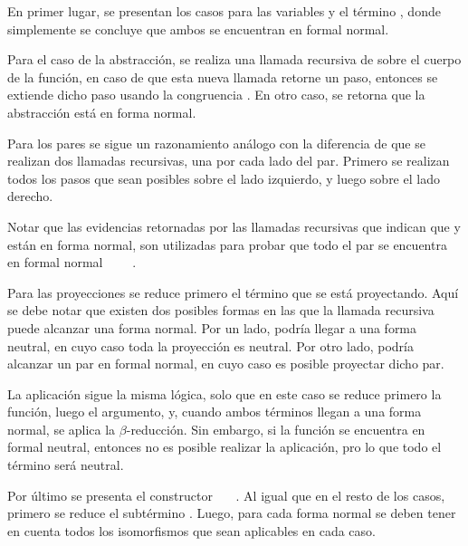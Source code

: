 En primer lugar, se presentan los casos para las variables y el término \const{$\star$}, donde simplemente se concluye que ambos se encuentran en formal normal.


Para el caso de la abstracción, se realiza una llamada recursiva de  sobre el cuerpo de la función, en caso de que esta nueva llamada retorne un paso, entonces se extiende dicho paso usando la congruencia \const{$\zeta$}.
En otro caso, se retorna que la abstracción está en forma normal.


Para los pares se sigue un razonamiento análogo con la diferencia de que se realizan dos llamadas recursivas, una por cada lado del par.
Primero se realizan todos los pasos que sean posibles sobre el lado izquierdo, y luego sobre el lado derecho.


Notar que las evidencias retornadas por las llamadas recursivas que indican que  y  están en forma normal, son utilizadas para probar que todo el par se encuentra en formal normal ~~\const{,}~~\const{$\rangle$}.

Para las proyecciones se reduce primero el término que se está proyectando.
Aquí se debe notar que existen dos posibles formas en las que la llamada recursiva puede alcanzar una forma normal.
Por un lado, podría llegar a una forma neutral, en cuyo caso toda la proyección es neutral.
Por otro lado, podría alcanzar un par en formal normal, en cuyo caso es posible proyectar dicho par.


La aplicación sigue la misma lógica, solo que en este caso se reduce primero la función, luego el argumento, y, cuando ambos términos llegan a una forma normal, se aplica la $\beta$-reducción.
Sin embargo, si la función se encuentra en formal neutral, entonces no es posible realizar la aplicación, pro lo que todo el término será neutral.


Por último se presenta el constructor \const{[}~~\const{]≡}~.
Al igual que en el resto de los casos, primero se reduce el subtérmino .
Luego, para cada forma normal se deben tener en cuenta todos los isomorfismos que sean aplicables en cada caso.


